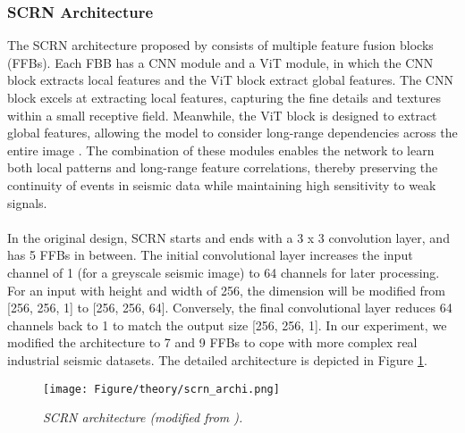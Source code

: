 \subsubsection{SCRN Architecture} \label{subsec:scrn_archi}
The SCRN architecture proposed by \citeauthor{gao2024swin} \citeyear{gao2024swin} consists of multiple feature fusion blocks (FFBs). Each FBB has a CNN module and a ViT module, in which the CNN block extracts local features and the ViT block extract global features. The CNN block excels at extracting local features, capturing the fine details and textures within a small receptive field. Meanwhile, the ViT block is designed to extract global features, allowing the model to consider long-range dependencies across the entire image \cite{dosovitskiy2020image}. The combination of these modules enables the network to learn both local patterns and long-range feature correlations, thereby preserving the continuity of events in seismic data while maintaining high sensitivity to weak signals.
\\\\
In the original design, SCRN starts and ends with a 3 x 3 convolution layer, and has 5 FFBs in between. The initial convolutional layer increases the input channel of 1 (for a greyscale seismic image) to 64 channels for later processing. For an input with height and width of 256, the dimension will be modified from [256, 256, 1] to [256, 256, 64]. Conversely, the final convolutional layer reduces 64 channels back to 1 to match the output size [256, 256, 1]. In our experiment, we modified the architecture to 7 and 9 FFBs to cope with more complex real industrial seismic datasets. The detailed architecture is depicted in Figure \ref{fig:scrn_archi}. 
\begin{figure}[h]
	\centering
	\texttt{[image: Figure/theory/scrn\_archi.png]} %
 	\caption{\textit{SCRN architecture (modified from ).}}
	\label{fig:scrn_archi}
\end{figure}

